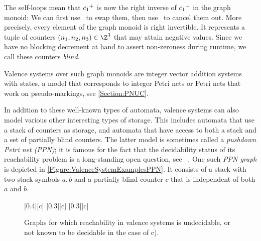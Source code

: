 \documentclass[../../diss.tex]{subfiles}
\begin{document}
\begin{example}
\begin{thmenumerate}[a)]
            The self-loops mean that \eg ${c_1}^+$ is now the right inverse of ${c_1}^-$ in the graph monoid:
            We can first use \RuleSwap~to swap them, then use \RuleCancel~to cancel them out.
            More precisely, every element of the graph monoid is right invertible.
            It represents a tuple of counters $(n_1,n_2,n_3) \in \Z^3$ that may attain negative values.
            Since we have no blocking decrement at hand to assert non-zeroness during runtime, we call these counters \emph{blind}.

            Valence systems over such graph monoids are integer vector addition systems with states, a model that corresponds to integer Petri nets or Petri nets that work on pseudo-markings, see \cref{Section:PNUC}.
    \end{thmenumerate}

    In addition to these well-known types of automata, valence systems can also model various other interesting types of storage.
    This includes automata that use a stack of counters as storage, and automata that have access to both a stack and a set of partially blind counters.
    The latter model is sometimes called a \emph{pushdown Petri net (PPN)}; it is famous for the fact that the decidability status of its reachability problem is a long-standing open question, see \eg~\cite{Lazic13}.
    One such \emph{PPN graph} is depicted in \cref{Figure:ValenceSystemExamplesPPN}.
    It consists of a stack with two stack symbols $a, b$ and a partially blind counter $c$ that is independent of both $a$ and $b$.
\end{example}

\begin{figure}[t]
    \centering%
    {%
        \centering%
        [0.4\textwidth][c]%
        {%
        }%
    }%
    {%
        \centering%
        [0.3\textwidth][c]
        {%
        }%
    }%
    {%
        \centering%
        [0.3\textwidth][c]
        {%
        }%
    }%
    \caption{Graphs for which reachability in valence systems is undecidable, or not known to be decidable in the case of c).}%
    \label{Figure:ValenceSystemExamplesEvil}%
\end{figure}
\end{document}
